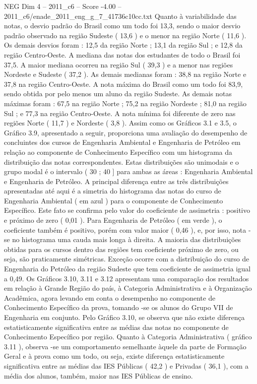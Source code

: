 \begin{textsample}{NEG Dim 4 – 2011\_c6 – Score -4.00 – 2011\_c6/enade\_2011\_eng\_g\_7\_41736c10cc.txt}
Quanto à variabilidade das notas, o desvio padrão do Brasil como um todo foi 13,3, sendo o maior desvio padrão observado na região Sudeste ( 13,6 ) e o menor na região Norte ( 11,6 ).
Os demais desvios foram : 12,5 da região Norte ; 13,1 da região Sul ; e 12,8 da região Centro-Oeste.
A mediana das notas dos estudantes de todo o Brasil foi 37,5.
A maior mediana ocorreu na região Sul ( 39,3 ) e a menor nas regiões Nordeste e Sudeste ( 37,2 ).
As demais medianas foram : 38,8 na região Norte e 37,8 na região Centro-Oeste.
A nota máxima do Brasil como um todo foi 83,9, sendo obtida por pelo menos um aluno da região Sudeste.
As demais notas máximas foram : 67,5 na região Norte ; 75,2 na região Nordeste ; 81,0 na região Sul ; e 77,3 na região Centro-Oeste.
A nota mínima foi diferente de zero nas regiões Norte ( 11,7 ) e Nordeste ( 3,8 ).
Assim como os Gráficos 3.1 e 3.5, o Gráfico 3.9, apresentado a seguir, proporciona uma avaliação do desempenho de concluintes dos cursos de Engenharia Ambiental e Engenharia de Petróleo em relação ao componente de Conhecimento Específico com um histograma da distribuição das notas correspondentes.
Estas distribuições são unimodais e o grupo modal é o intervalo ( 30 ; 40 ] para ambas as áreas : Engenharia Ambiental e Engenharia de Petróleo.
A principal diferença entre as três distribuições apresentadas até aqui é a simetria do histograma das notas do curso de Engenharia Ambiental ( em azul ) para o componente de Conhecimento Específico.
Este fato se confirma pelo valor do coeficiente de assimetria : positivo e próximo de zero ( 0,01 ).
Para Engenharia de Petróleo ( em verde ), o coeficiente também é positivo, porém com valor maior ( 0,46 ), e, por isso, nota -se no histograma uma cauda mais longa à direita.
A maioria das distribuições obtidas para os cursos dentro das regiões tem coeficiente próximo de zero, ou seja, são praticamente simétricas.
Exceção ocorre com a distribuição do curso de Engenharia do Petróleo da região Sudeste que tem coeficiente de assimetria igual a 0,49.
Os Gráficos 3.10, 3.11 e 3.12 apresentam uma comparação dos resultados em relação à Grande Região do país, à Categoria Administrativa e à Organização Acadêmica, agora levando em conta o desempenho no componente de Conhecimento Específico da prova, tomando -se os alunos do Grupo VII de Engenharia em conjunto.
Pelo Gráfico 3.10, se observa que não existe diferença estatisticamente significativa entre as médias das notas no componente de Conhecimento Específico por região.
Quanto à Categoria Administrativa ( gráfico 3.11 ), observa -se um comportamento semelhante àquele da parte de Formação Geral e à prova como um todo, ou seja, existe diferença estatisticamente significativa entre as médias das IES Públicas ( 42,2 ) e Privadas ( 36,1 ), com a média dos alunos, também, maior nas IES Públicas de ensino.

\end{textsample}
